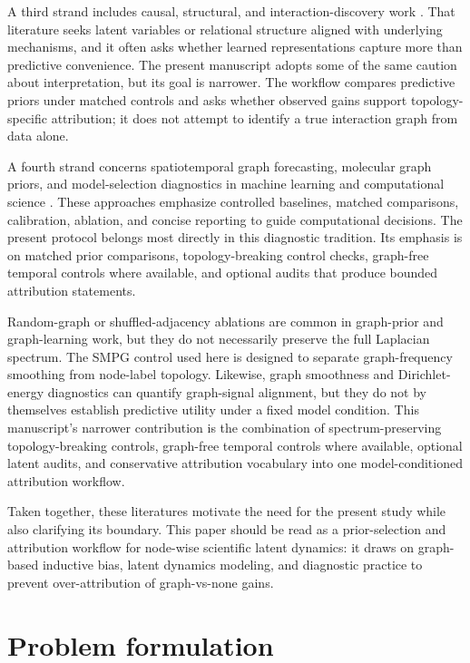 \documentclass[preprint,12pt]{elsarticle}
\begin{document}
A third strand includes causal, structural, and interaction-discovery work \citep{scholkopf2021toward,kipf2018nri}. That literature seeks latent variables or relational structure aligned with underlying mechanisms, and it often asks whether learned representations capture more than predictive convenience. The present manuscript adopts some of the same caution about interpretation, but its goal is narrower. The workflow compares predictive priors under matched controls and asks whether observed gains support topology-specific attribution; it does not attempt to identify a true interaction graph from data alone.

A fourth strand concerns spatiotemporal graph forecasting, molecular graph priors, and model-selection diagnostics in machine learning and computational science \citep{li2018dcrnn,yu2018stgcn,wu2019graphwavenet,schutt2018schnet,satorras2021egnn}. These approaches emphasize controlled baselines, matched comparisons, calibration, ablation, and concise reporting to guide computational decisions. The present protocol belongs most directly in this diagnostic tradition. Its emphasis is on matched prior comparisons, topology-breaking control checks, graph-free temporal controls where available, and optional audits that produce bounded attribution statements.

Random-graph or shuffled-adjacency ablations are common in graph-prior and graph-learning work, but they do not necessarily preserve the full Laplacian spectrum. The SMPG control used here is designed to separate graph-frequency smoothing from node-label topology. Likewise, graph smoothness and Dirichlet-energy diagnostics can quantify graph-signal alignment, but they do not by themselves establish predictive utility under a fixed model condition. This manuscript's narrower contribution is the combination of spectrum-preserving topology-breaking controls, graph-free temporal controls where available, optional latent audits, and conservative attribution vocabulary into one model-conditioned attribution workflow.

Taken together, these literatures motivate the need for the present study while also clarifying its boundary. This paper should be read as a prior-selection and attribution workflow for node-wise scientific latent dynamics: it draws on graph-based inductive bias, latent dynamics modeling, and diagnostic practice to prevent over-attribution of graph-vs-none gains.

\section{Problem formulation}
\end{document}

